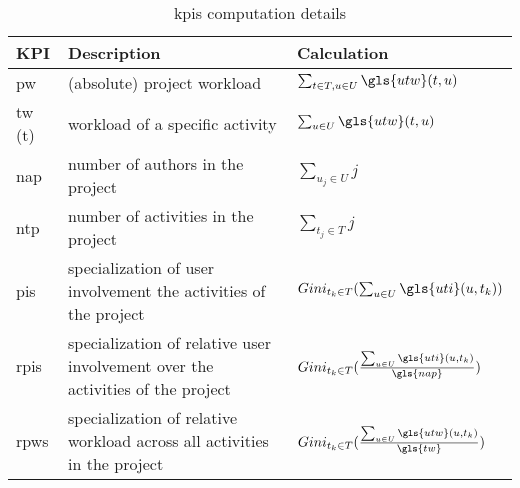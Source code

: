 \begin{table}[]
\centering
\caption{\glspl{kpi} computation details}
\label{tab:kpis-computation}
\begin{tabular}{@{}m{1.5cm}m{6cm}m{4cm}@{}}
\toprule
\textbf{KPI} & \textbf{Description}                           & \textbf{Calculation}                     \\ \midrule
\gls{pw}     & (absolute) project workload                    & $\sum_{t \in T, u \in U} \gls{utw}(t,u)$ \\
\gls{tw} (t) & workload of a specific activity  & $\sum_{u \in U} \gls{utw}(t,u) $         \\
\gls{nap}    & number of authors in the project               & $\sum_{u_j \in U} j$                     \\
\gls{ntp}    & number of activities in the project         & $\sum_{t_j \in T} j$                     \\
\gls{pis}  & specialization of user involvement the activities of the project               & $Gini_{{t_k} \in T} (\sum_{u \in U}\gls{uti}(u, t_k))$                \\
\gls{rpis} & specialization of relative user involvement over the activities of the project & $Gini_{{t_k} \in T} ( \frac{\sum_{u \in U} \gls{uti}(u, t_k)}{ \gls{nap}} ) $ \\
\gls{rpws} & specialization of relative workload across all activities in the project       & $Gini_{{t_k} \in T} ( \frac {\sum_{u \in U} \gls{utw}(u, t_k) } { \gls{tw}})$  \\ \bottomrule
\end{tabular}%
\end{table}